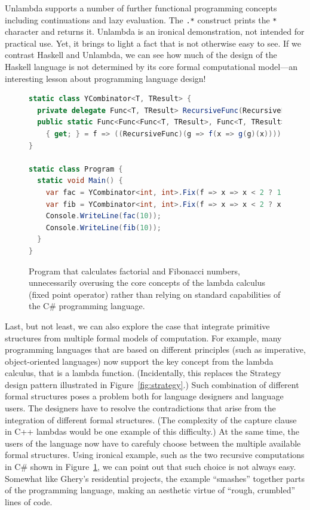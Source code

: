 Unlambda supports a number of further functional programming concepts including continuations
and lazy evaluation. The \texttt{.*} construct prints the \texttt{*} character and returns it.
Unlambda is an ironical demonstration, not intended for practical use. Yet, it brings to light
a fact that is not otherwise easy to see. If we contrast Haskell and Unlambda,
we can see how much of the design of the Haskell language is not determined by its core
formal computational model---an interesting lesson about programming language design!

\begin{figure}
\begin{lstlisting}[language=csharp]
static class YCombinator<T, TResult> {
  private delegate Func<T, TResult> RecursiveFunc(RecursiveFunc r);
  public static Func<Func<Func<T, TResult>, Func<T, TResult>>, Func<T, TResult>> Fix
    { get; } = f => ((RecursiveFunc)(g => f(x => g(g)(x))))(g => f(x => g(g)(x)));
}

static class Program {
  static void Main() {
    var fac = YCombinator<int, int>.Fix(f => x => x < 2 ? 1 : x * f(x - 1));
    var fib = YCombinator<int, int>.Fix(f => x => x < 2 ? x : f(x - 1) + f(x - 2));
    Console.WriteLine(fac(10));
    Console.WriteLine(fib(10));
  }
}
\end{lstlisting}
\caption{Program that calculates factorial and Fibonacci numbers, unnecessarily overusing
the core concepts of the lambda calculus (fixed point operator) rather than relying on
standard capabilities of the C\# programming language.}
\label{fig:ycombinator}
\end{figure}

Last, but not least, we can also explore the case that integrate primitive structures from
multiple formal models of computation. For example, many programming languages that are based
on different principles (such as imperative, object-oriented languages) now support the
key concept from the lambda calculus, that is a lambda function. (Incidentally, this replaces
the Strategy design pattern illustrated in Figure~\ref{fig:strategy}.) Such combination of
different formal structures poses a problem both for language designers and language users.
The designers have to resolve the contradictions that arise from the integration of different
formal structures. (The complexity of the capture clause in C++ lambdas would be one example
of this difficulty.)
At the same time, the users of the language now have to carefuly choose between the multiple
available formal structures. Using ironical example, such as the two recursive
computations in C\# shown in Figure~\ref{fig:ycombinator}, we can point out that such choice
is not always easy. Somewhat like Ghery's residential projects, the example ``smashes'' together
parts of the programming language, making an aesthetic virtue of ``rough, crumbled'' lines of code.


